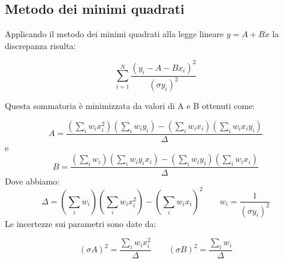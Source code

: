 \begin{appendices}

\section{Metodo dei minimi quadrati}
Applicando il metodo dei minimi quadrati alla legge lineare $ y = A + Bx$ la discrepanza risulta:

\begin{equation}
\displaystyle\sum_{i=1}^{N}\frac{(y_i -A-Bx_i)^2}{(\sigma y_i)^2}
\end{equation}
\hspace{-1.8em}

Questa sommatoria è minimizzata da valori di A e B ottenuti come:

\begin{equation}
\label{eq:a}
A = \frac{(\sum_i w_i x_i^2)(\sum_i w_i y_i)-(\sum_i w_i x_i)(\sum_i w_i x_i y_i)}{\Delta} 
\end{equation}
e
\begin{equation}
\label{eq:b}
B = \frac{(\sum_i w_i)(\sum_i w_i y_i x_i)-(\sum_i w_i y_i)(\sum_i w_i x_i)}{\Delta}
\end{equation}
Dove abbiamo:
\[ \Delta = (\sum_i w_i)(\sum_i w_i x_i^2)-(\sum_i w_i x_i)^2  \quad \quad  w_i = \frac{1}{(\sigma y_i)^2}\]
\hspace{-1.8em}
Le incertezze sui parametri sono date da:

\begin{equation} 
\label{eq:sasb}
(\sigma A)^2 = \frac{\sum_i w_i x_i^2}{\Delta}\quad \quad (\sigma B)^2 = \frac{\sum_i w_i}{\Delta}
\end{equation}

\end{appendices}
